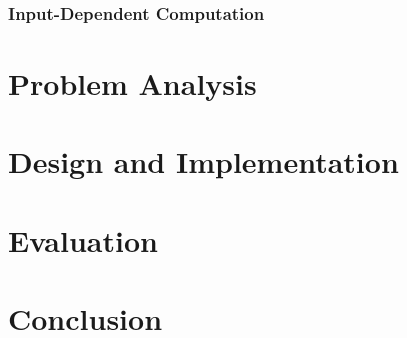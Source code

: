 \documentclass[12pt]{article}
\begin{document}
\subsubsection{Input-Dependent Computation}



\section{Problem Analysis}

\section{Design and Implementation}

\section{Evaluation}

\section{Conclusion}


\end{document}

